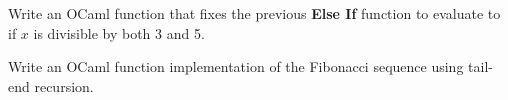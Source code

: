 \vspace{1em}
\begin{Exercise}
Write an OCaml function that fixes the previous \textbf{Else If} function to evaluate to  if $x$ is divisible by both 3 and 5.
\end{Exercise}

\vspace{1em}
\begin{Exercise}
Write an OCaml function implementation of the Fibonacci sequence using tail-end recursion.
\end{Exercise}

\newpage 




